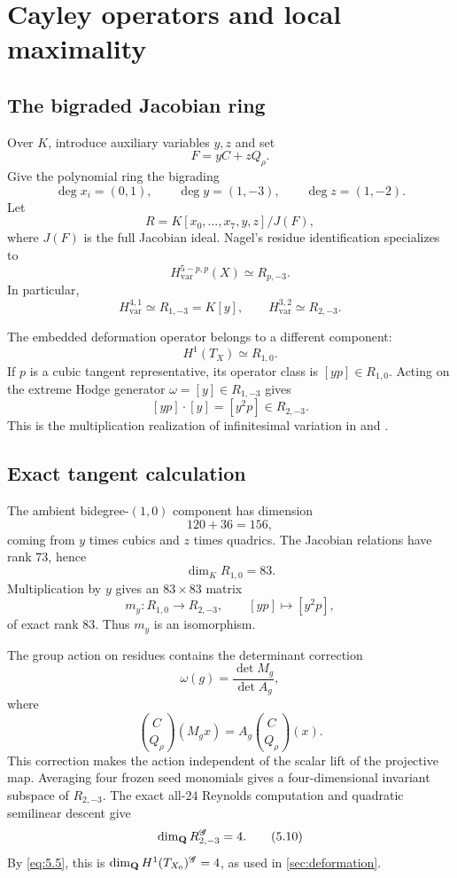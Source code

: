 \section{Cayley operators and local maximality}
\label{sec:cayley-local}

\subsection{The bigraded Jacobian ring}

Over \(K\), introduce auxiliary variables \(y,z\) and set
\[
 F=yC+zQ_\rho.
\]
Give the polynomial ring the bigrading
\[
 \deg x_i=(0,1),\qquad
 \deg y=(1,-3),\qquad
 \deg z=(1,-2).                                    \tag{5.1}
\]
Let
\[
 R=K[x_0,\ldots,x_7,y,z]/J(F),                     \tag{5.2}
\]
where \(J(F)\) is the full Jacobian ideal.  Nagel's residue
identification \cite[Definition 2.15 and Proposition 2.16]{Nagel1997}
specializes to
\[
 H_{\mathrm{var}}^{5-p,p}(X)\simeq R_{p,-3}.
                                                               \tag{5.3}
\]
In particular,
\[
 H^{4,1}_{\mathrm{var}}\simeq R_{1,-3}=K[y],
 \qquad
 H^{3,2}_{\mathrm{var}}\simeq R_{2,-3}.            \tag{5.4}
\]

The embedded deformation operator belongs to a different component:
\[
 H^1(T_X)\simeq R_{1,0}.                            \tag{5.5}
\label{eq:5.5}
\]
If \(p\) is a cubic tangent representative, its operator class is
\([yp]\in R_{1,0}\).  Acting on the extreme Hodge generator
\(\omega=[y]\in R_{1,-3}\) gives
\[
 [yp]\cdot[y]=[y^2p]\in R_{2,-3}.                  \tag{5.6}
\]
This is the multiplication realization of infinitesimal variation in
\cite[Lemma 3.1]{Nagel1997} and
\cite[Theorem 6.1(2),(3)]{Konno1991}.

\subsection{Exact tangent calculation}

The ambient bidegree-\((1,0)\) component has dimension
\[
 120+36=156,
\]
coming from \(y\) times cubics and \(z\) times quadrics.  The Jacobian
relations have rank \(73\), hence
\[
 \dim_KR_{1,0}=83.                                  \tag{5.7}
\]
Multiplication by \(y\) gives an \(83\times83\) matrix
\[
 m_y:R_{1,0}\longrightarrow R_{2,-3},\qquad
 [yp]\longmapsto[y^2p],                             \tag{5.8}
\label{eq:5.8}
\]
of exact rank \(83\).  Thus \(m_y\) is an isomorphism.

The group action on residues contains the determinant correction
\[
 \omega(g)=\frac{\det M_g}{\det A_g},
\]
where
\[
 \binom C{Q_\rho}(M_gx)=A_g\binom C{Q_\rho}(x).
                                                               \tag{5.9}
\]
This correction makes the action independent of the scalar lift of the
projective map.  Averaging four frozen seed monomials gives a
four-dimensional invariant subspace of \(R_{2,-3}\).  The exact all-\(24\)
Reynolds computation and quadratic semilinear descent give
\[
 \dim_\mathbf Q R_{2,-3}^{\mathscr G}=4.                    \tag{5.10}
\]
By \cref{eq:5.5}, this is
\(\dim_\mathbf Q H^1(T_{X_0})^{\mathscr G}=4\), as used in
\cref{sec:deformation}.

